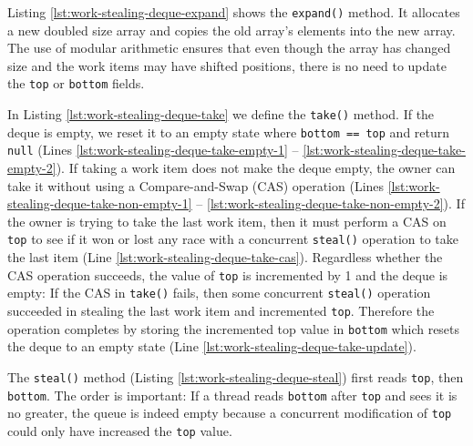 

Listing \ref{lst:work-stealing-deque-expand} shows the
\lstinline!expand()! method. It allocates a new doubled size array and
copies the old array's elements into the new array. The use of modular
arithmetic ensures that even though the array has changed size and the
work items may have shifted positions, there is no need to update the
\lstinline!top! or \lstinline!bottom! fields.



In Listing \ref{lst:work-stealing-deque-take} we define the
\lstinline!take()! method. If the deque is empty, we reset it to an
empty state where \lstinline!bottom == top! and return
\lstinline!null! (Lines \ref{lst:work-stealing-deque-take-empty-1} --
\ref{lst:work-stealing-deque-take-empty-2}). If taking a work item
does not make the deque empty, the owner can take it without using a
Compare-and-Swap (CAS) operation (Lines
\ref{lst:work-stealing-deque-take-non-empty-1} --
\ref{lst:work-stealing-deque-take-non-empty-2}). If the owner is
trying to take the last work item, then it must perform a CAS on
\lstinline!top! to see if it won or lost any race with a concurrent
\lstinline!steal()! operation to take the last item (Line
\ref{lst:work-stealing-deque-take-cas}). Regardless whether the CAS
operation succeeds, the value of \lstinline!top! is incremented by 1
and the deque is empty: If the CAS in \lstinline!take()! fails, then
some concurrent \lstinline!steal()!  operation succeeded in stealing
the last work item and incremented \lstinline!top!. Therefore the
operation completes by storing the incremented top value in
\lstinline!bottom! which resets the deque to an empty state (Line
\ref{lst:work-stealing-deque-take-update}).



The \lstinline!steal()! method (Listing
\ref{lst:work-stealing-deque-steal}) first reads \lstinline!top!, then
\lstinline!bottom!. The order is important: If a thread reads
\lstinline!bottom! after \lstinline!top! and sees it is no greater,
the queue is indeed empty because a concurrent modification of
\lstinline!top! could only have increased the \lstinline!top! value.

